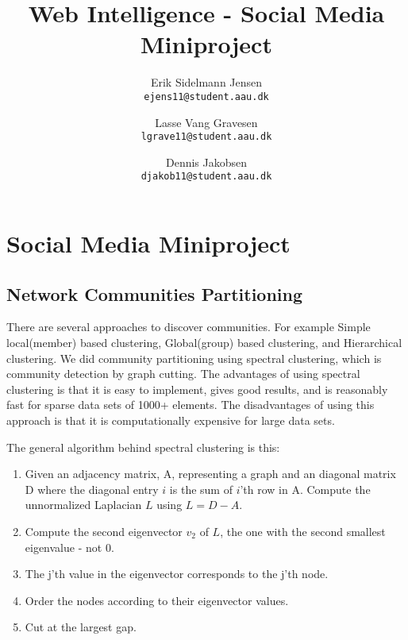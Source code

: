 

\author{
  Erik Sidelmann Jensen\\
  \texttt{ejens11@student.aau.dk}
  \and
  Lasse Vang Gravesen\\
  \texttt{lgrave11@student.aau.dk}
  \and
  Dennis Jakobsen\\
  \texttt{djakob11@student.aau.dk}  
}

\title{Web Intelligence - Social Media Miniproject}
\date{}


	\clearpage\maketitle
	\thispagestyle{empty}
	
	\chapter{Social Media Miniproject}
	\section{Network Communities Partitioning}
	There are several approaches to discover communities. For example Simple local(member) based clustering, Global(group) based clustering, and Hierarchical clustering.	
	We did community partitioning using spectral clustering, which is community detection by graph cutting. The advantages of using spectral clustering is that it is easy to implement, gives good results, and is reasonably fast for sparse data sets of 1000+ elements. The disadvantages of using this approach is that it is computationally expensive for large data sets.
	
	The general algorithm behind spectral clustering is this:
	\begin{enumerate}
	\item Given an adjacency matrix, A, representing a graph and an diagonal matrix D where the diagonal entry $i$ is the sum of $i$'th row in A. Compute the unnormalized Laplacian $L$ using $L = D-A$.
	\item Compute the second eigenvector $v_2$ of $L$, the one with the second smallest eigenvalue - not 0.
	\item The j'th value in the eigenvector corresponds to the j'th node.
	\item Order the nodes according to their eigenvector values.
	\item Cut at the largest gap.
	\end{enumerate}
	
